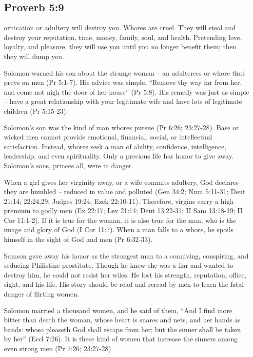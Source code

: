 \subsection{Proverb 5:9}
ornication or adultery will destroy you. Whores are cruel. They will steal and destroy your reputation, time, money, family, soul, and health. Pretending love, loyalty, and pleasure, they will use you until you no longer benefit them; then they will dump you.

Solomon warned his son about the strange woman – an adulteress or whore that preys on men (Pr 5:1-7). His advice was simple, “Remove thy way far from her, and come not nigh the door of her house” (Pr 5:8). His remedy was just as simple – have a great relationship with your legitimate wife and have lots of legitimate children (Pr 5:15-23).

Solomon’s son was the kind of man whores pursue (Pr 6:26; 23:27-28). Base or wicked men cannot provide emotional, financial, social, or intellectual satisfaction. Instead, whores seek a man of ability, confidence, intelligence, leadership, and even spirituality. Only a precious life has honor to give away. Solomon’s sons, princes all, were in danger.

When a girl gives her virginity away, or a wife commits adultery, God declares they are humbled – reduced in value and polluted (Gen 34:2; Num 5:11-31; Deut 21:14; 22:24,29; Judges 19:24; Ezek 22:10-11). Therefore, virgins carry a high premium to godly men (Ex 22:17; Lev 21:14; Deut 13:22-31; II Sam 13:18-19; II Cor 11:1-2). If it is true for the woman, it is also true for the man, who is the image and glory of God (I Cor 11:7). When a man falls to a whore, he spoils himself in the sight of God and men (Pr 6:32-33).

Samson gave away his honor as the strongest man to a conniving, conspiring, and seducing Philistine prostitute. Though he knew she was a liar and wanted to destroy him, he could not resist her wiles. He lost his strength, reputation, office, sight, and his life. His story should be read and reread by men to learn the fatal danger of flirting women.

Solomon married a thousand women, and he said of them, “And I find more bitter than death the woman, whose heart is snares and nets, and her hands as bands: whoso pleaseth God shall escape from her; but the sinner shall be taken by her” (Eccl 7:26). It is these kind of women that increase the sinners among even strong men (Pr 7:26; 23:27-28).

